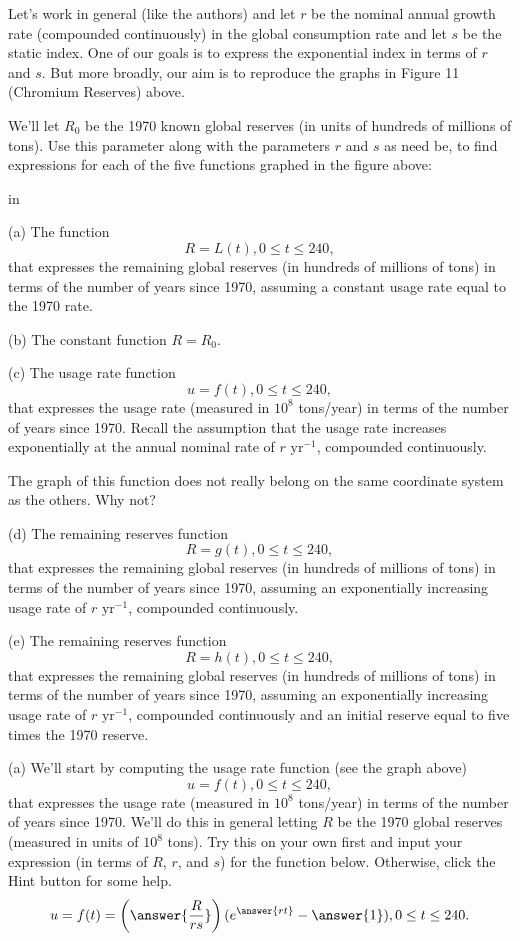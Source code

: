 \documentclass{ximera}
\newcommand{\pskip}{\vskip 0.1 in}
\begin{document}
\begin{question}   \label{Q34fratr5}
Let's work in general (like the authors) and let $r$ be the nominal annual growth rate (compounded continuously) in the global consumption rate and let $s$ be the static index. One of our goals is to express  the exponential index in terms of $r$ and $s$.  
But more broadly, our aim is to reproduce the graphs in Figure 11 (Chromium Reserves) above. 



We'll let $R_0$ be the 1970 known global reserves (in units of hundreds of millions of tons). Use this parameter along with the parameters $r$ and $s$ as need be, to find expressions for each of the five functions graphed in the figure above:

\pskip 

(a) The function 
\[
   R = L(t), 0\leq t \leq 240,
\]
that expresses the remaining global reserves (in hundreds of millions of tons) in terms of the number of years since 1970, assuming a constant usage rate equal to the 1970 rate.

(b) The constant function $R=R_0$.

(c) The usage rate function 
\[
     u = f(t) , 0\leq t \leq 240,
\]
that expresses the usage rate (measured in $10^8$ tons/year) in terms of the number of years since 1970. Recall the assumption that the usage rate increases exponentially at the annual nominal rate of $r \text{ yr}^{-1}$, compounded continuously.

The graph of this function does not really belong on the same coordinate system as the others. Why not?

(d) The remaining reserves function
\[
    R = g(t) , 0\leq t \leq 240,
\]
that expresses the remaining global reserves (in hundreds of millions of tons) in terms of the number of years since 1970, assuming an exponentially increasing usage rate of $r \text{ yr}^{-1}$, compounded continuously.

(e) The remaining reserves function
\[
    R = h(t) , 0\leq t \leq 240,
\]
that expresses the remaining global reserves (in hundreds of millions of tons) in terms of the number of years since 1970, assuming an exponentially increasing usage rate of $r \text{ yr}^{-1}$, compounded continuously and an initial reserve equal to five times the 1970 reserve.




(a) We'll start by computing the usage rate function (see the graph above)
\[
     u = f(t) , 0\leq t \leq 240,
\]
that expresses the usage rate (measured in $10^8$ tons/year) in terms of the number of years since 1970. We'll do this in general letting $R$ be the 1970 global reserves (measured in units of $10^8$ tons). Try this on your own first and input your expression (in terms of $R$, $r$, and $s$) for the function below. Otherwise, click the Hint button for some help.
\[
   u = f(t) = \left( \answer{\frac{R}{rs}} \right) (e^{\answer{rt}} - \answer{1}) , 0\leq t \leq 240 .
\]


\end{question}
\end{document}
